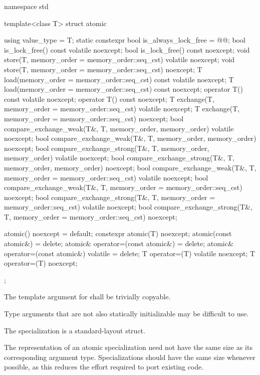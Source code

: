 %
%
\begin{codeblock}
namespace std {
  template<class T> struct atomic {
    using value_type = T;
    static constexpr bool is_always_lock_free = @@;
    bool is_lock_free() const volatile noexcept;
    bool is_lock_free() const noexcept;
    void store(T, memory_order = memory_order::seq_cst) volatile noexcept;
    void store(T, memory_order = memory_order::seq_cst) noexcept;
    T load(memory_order = memory_order::seq_cst) const volatile noexcept;
    T load(memory_order = memory_order::seq_cst) const noexcept;
    operator T() const volatile noexcept;
    operator T() const noexcept;
    T exchange(T, memory_order = memory_order::seq_cst) volatile noexcept;
    T exchange(T, memory_order = memory_order::seq_cst) noexcept;
    bool compare_exchange_weak(T&, T, memory_order, memory_order) volatile noexcept;
    bool compare_exchange_weak(T&, T, memory_order, memory_order) noexcept;
    bool compare_exchange_strong(T&, T, memory_order, memory_order) volatile noexcept;
    bool compare_exchange_strong(T&, T, memory_order, memory_order) noexcept;
    bool compare_exchange_weak(T&, T, memory_order = memory_order::seq_cst) volatile noexcept;
    bool compare_exchange_weak(T&, T, memory_order = memory_order::seq_cst) noexcept;
    bool compare_exchange_strong(T&, T, memory_order = memory_order::seq_cst) volatile noexcept;
    bool compare_exchange_strong(T&, T, memory_order = memory_order::seq_cst) noexcept;

    atomic() noexcept = default;
    constexpr atomic(T) noexcept;
    atomic(const atomic&) = delete;
    atomic& operator=(const atomic&) = delete;
    atomic& operator=(const atomic&) volatile = delete;
    T operator=(T) volatile noexcept;
    T operator=(T) noexcept;
  };
}
\end{codeblock}

%
\pnum
The template argument for
 shall be trivially copyable. \begin{note} Type arguments that are
not also statically initializable may be difficult to use. \end{note}

\pnum
The specialization  is a standard-layout struct.

\pnum
\begin{note} The representation of an atomic specialization need not have the same size as its
corresponding argument type. Specializations should have the same size whenever possible, as
this reduces the effort required to port existing code. \end{note}

